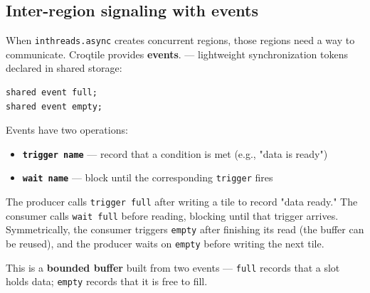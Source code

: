 \subsection*{Inter-region signaling with events}

When \texttt{inthreads.\allowbreak{}async} creates concurrent regions, those regions need a way to communicate. Croqtile provides \textbf{events}. --- lightweight synchronization tokens declared in shared storage:

\begin{lstlisting}[language=croqtile,caption={Inter-region signaling with events}]
shared event full;
shared event empty;
\end{lstlisting}

Events have two operations:

\begin{itemize}[leftmargin=1.6em]
\item \textbf{\texttt{trigger name}} --- record that a condition is met (e.g., "data is ready")
\item \textbf{\texttt{wait name}} --- block until the corresponding \texttt{trigger} fires
\end{itemize}

The producer calls \texttt{trigger full} after writing a tile to record "data ready." The consumer calls \texttt{wait full} before reading, blocking until that trigger arrives. Symmetrically, the consumer triggers \texttt{empty} after finishing its read (the buffer can be reused), and the producer waits on \texttt{empty} before writing the next tile.

This is a \textbf{bounded buffer} built from two events --- \texttt{full} records that a slot holds data; \texttt{empty} records that it is free to fill.
